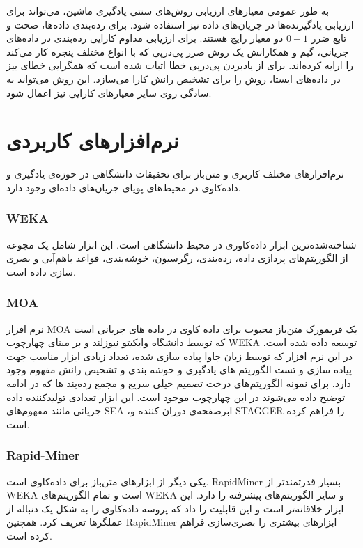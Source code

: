 به طور عمومی معیارهای ارزیابی روش‌های سنتی یادگیری ماشین، می‌تواند برای ارزیابی یادگیرنده‌ها در جریان‌های داده نیز استفاده شود. برای رده‌بندی داده‌ها، صحت
و تابع ضرر $0-1$ دو معیار رایج هستند. برای ارزیابی مداوم کارایی رده‌بندی در داده‌های جریانی، گیم
و همکارانش یک روش ضرر پی‌در‌پی که با انواع مختلف پنجره کار می‌کند را ارایه کرده‌اند. برای از یاد‌بردن پی‌در‌پی خطا اثبات شده است که همگرایی خطای بیز در داده‌های ایستا، روش را برای تشخیص رانش کارا می‌سازد. این روش می‌تواند به سادگی روی سایر معیار‌های کارایی نیز اعمال شود.

\section{نرم‌افزارهای کاربردی}
نرم‌افزارهای مختلف کاربری و متن‌باز برای تحقیقات دانشگاهی در حوزه‌ی یادگیری و داده‌کاوی در محیط‌های پویای جریان‌های داده‌ای وجود دارد.

\subsubsection{WEKA}
شناخته‌شده‌ترین ابزار داده‌کاوری در محیط دانشگاهی است. این ابزار شامل یک مجوعه از الگوریتم‌های پردازی داده، رده‌بندی، رگرسیون، خوشه‌بندی، قواعد باهم‌آیی و بصری سازی داده است.

\subsubsection{MOA}
نرم افزار MOA یک فریمورک متن‌باز محبوب برای داده کاوی در داده های جریانی است که توسط دانشگاه وایکیتو نیوزلند
 و بر مبنای چهارچوب  WEKA توسعه داده شده است. در این نرم افزار که توسط زبان جاوا پیاده سازی شده، تعداد زیادی ابزار مناسب جهت پیاده سازی و تست الگوریتم های یادگیری و خوشه بندی و تشخیص رانش مفهوم وجود دارد. برای نمونه الگوریتم‌های درخت‌ تصمیم خیلی سریع و مجمع رده‌بند ها که در ادامه توضیح داده‌ می‌شوند در این چهارچوب موجود است.
این ابزار تعدادی تولید‌‌کننده
 داده جریانی مانند مفهوم‌های SEA  ،ابرصفحه‌ی دوران کننده
 و STAGGER را فراهم کرده است.
\subsubsection{Rapid-Miner}

یکی دیگر از ابزارهای متن‌باز برای داده‌کاوی است. RapidMiner بسیار قدرتمندتر از WEKA است و تمام الگوریتم‌های WEKA و سایر الگوریتم‌های پیشرفته را دارد. این ابزار خلاقانه‌تر است و این قابلیت را داد که پروسه داده‌کاوی را به شکل یک دنباله از عملگرها تعریف کرد. همچنین RapidMiner ابزارهای بیشتری را بصری‌سازی فراهم کرده است.
